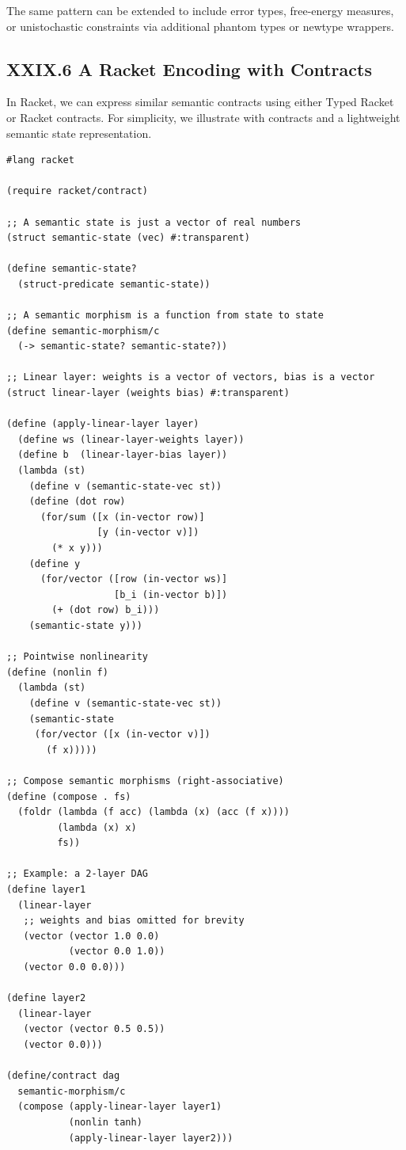 \documentclass[11pt,letterpaper]{article}
\begin{document}
The same pattern can be extended to include error types, free-energy measures, or unistochastic constraints via additional phantom types or newtype wrappers.

\subsection{XXIX.6 A Racket Encoding with Contracts}

In Racket, we can express similar semantic contracts using either Typed Racket or Racket contracts. For simplicity, we illustrate with contracts and a lightweight semantic state representation.

\begin{verbatim}
#lang racket

(require racket/contract)

;; A semantic state is just a vector of real numbers
(struct semantic-state (vec) #:transparent)

(define semantic-state?
  (struct-predicate semantic-state))

;; A semantic morphism is a function from state to state
(define semantic-morphism/c
  (-> semantic-state? semantic-state?))

;; Linear layer: weights is a vector of vectors, bias is a vector
(struct linear-layer (weights bias) #:transparent)

(define (apply-linear-layer layer)
  (define ws (linear-layer-weights layer))
  (define b  (linear-layer-bias layer))
  (lambda (st)
    (define v (semantic-state-vec st))
    (define (dot row)
      (for/sum ([x (in-vector row)]
                [y (in-vector v)])
        (* x y)))
    (define y
      (for/vector ([row (in-vector ws)]
                   [b_i (in-vector b)])
        (+ (dot row) b_i)))
    (semantic-state y)))

;; Pointwise nonlinearity
(define (nonlin f)
  (lambda (st)
    (define v (semantic-state-vec st))
    (semantic-state
     (for/vector ([x (in-vector v)])
       (f x)))))

;; Compose semantic morphisms (right-associative)
(define (compose . fs)
  (foldr (lambda (f acc) (lambda (x) (acc (f x))))
         (lambda (x) x)
         fs))

;; Example: a 2-layer DAG
(define layer1
  (linear-layer
   ;; weights and bias omitted for brevity
   (vector (vector 1.0 0.0)
           (vector 0.0 1.0))
   (vector 0.0 0.0)))

(define layer2
  (linear-layer
   (vector (vector 0.5 0.5))
   (vector 0.0)))

(define/contract dag
  semantic-morphism/c
  (compose (apply-linear-layer layer1)
           (nonlin tanh)
           (apply-linear-layer layer2)))
\end{verbatim}
\end{document}
